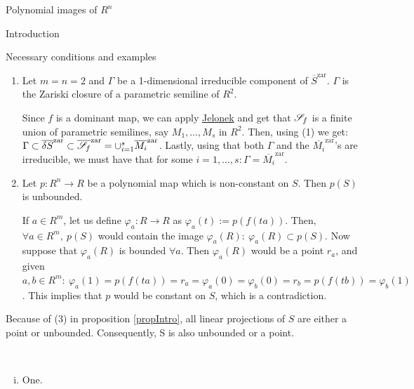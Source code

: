 \documentclass[11pt, a4paper, english, twoside, notitlepage]{report}
\begin{document}
\begin{chapter}{Polynomial images of $R^n$}
\begin{section}{Introduction}
\begin{subsection}{Necessary conditions and examples}
\begin{proposition}
\begin{enumerate}[(1)]
			\item Let $m = n = 2$ and $\Gamma$ be a 1-dimensional irreducible component of $\overline{S}^{\text{zar}}$. $\Gamma$ is the Zariski closure of a parametric semiline of $R^2$.
				\begin{Proof}
					Since $f$ is a dominant map, we can apply \hyperref[jelonek]{Jelonek} and get that $\S_f$ is a finite union of parametric semilines, say $M_1, \dots, M_s$ in $R^2$. Then, using (1) we get: $\Gamma \subset \overline{\delta S}^{\text{zar}} \subset \overline{\S_f}^{\text{zar}} = \cup_{i=1}^s  \overline{M_i}^{\text{zar}}$. Lastly, using that both $\Gamma$ and the $\overline{M_i}^{\text{zar}}$'s are irreducible, we must have that for some $i = 1, \dots, s: \Gamma = \overline{M_i}^{\text{zar}}$.
				\end{Proof}
			
			\item Let $p:R^n \rightarrow R$ be a polynomial map which is non-constant on $S$. Then $p(S)$ is unbounded.
				\begin{Proof}
					If $a \in R^m$, let us define $\varphi_a:R \rightarrow R$ as $\varphi_a(t) := p(f(ta))$. Then, $\forall a \in R^m,\ p(S)$ would contain the image $\varphi_a(R):\ \varphi_a(R) \subset p(S)$. Now suppose that $\varphi_a(R)$ is bounded $\forall a$. Then $\varphi_a(R)$ would be a point $r_a$, and given $a, b \in R^m: \ \varphi_a(1) = p(f(ta)) = r_a = \varphi_a(0) = \varphi_b(0) = r_b = p(f(tb)) = \varphi_b(1)$. This implies that $p$ would be constant on $S$, which is a contradiction.
				\end{Proof}
			
		\end{enumerate}
		
	\end{proposition}	
	
	\begin{corolary}
		Because of (3) in proposition \ref{propIntro}, all linear projections of $S$ are either a point or unbounded. Consequently, S is also unbounded or a point.
	\end{corolary}
	
	\begin{example}
		\
		\begin{enumerate}[(i)]
			
			\item One.
			
			
			

\end{enumerate}
\end{example}
\end{subsection}
\end{section}
\end{chapter}
\end{document}
